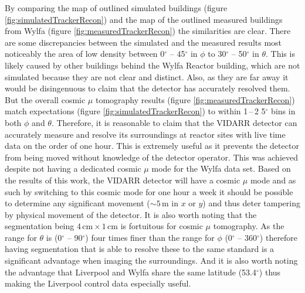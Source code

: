 


By comparing the map of outlined simulated buildings (figure \ref{fig:simulatedTrackerRecon}) and the map of the outlined measured buildings from Wylfa (figure \ref{fig:measuredTrackerRecon}) the similarities are clear. There are some discrepancies between the simulated and the measured results most noticeably the area of low density between 0$^\circ$ -- 45$^\circ$ in $\phi$ to 30$^\circ$ -- 50$^\circ$ in $\theta$. This is likely caused by other buildings behind the Wylfa Reactor building, which are not simulated because they are not clear and distinct. Also, as they are far away it would be disingenuous to claim that the detector has accurately resolved them. But the overall cosmic $\mu$ tomography results (figure \ref{fig:measuredTrackerRecon}) match expectations (figure \ref{fig:simulatedTrackerRecon}) to within 1\,--\,2 5$^\circ$ bins in both $\phi$ and $\theta$. Therefore, it is reasonable to claim that the VIDARR detector can accurately measure and resolve its surroundings at reactor sites with live time data on the order of one hour. This is extremely useful as it prevents the detector from being moved without knowledge of the detector operator. This was achieved despite not having a dedicated cosmic $\mu$ mode for the Wylfa data set. Based on the results of this work, the VIDARR detector will have a cosmic $\mu$ mode and as such by switching to this cosmic mode for one hour a week it should be possible to determine any significant movement ($\sim 5\,\textrm{m}$ in $x$ or $y$) and thus deter tampering by physical movement of the detector. It is also worth noting that the segmentation being $4\,\textrm{cm} \times 1\,\textrm{cm}$ is fortuitous for cosmic $\mu$ tomography. As the range for $\theta$ is (0$^\circ$ -- 90$^\circ$) four times finer than the range for $\phi$ (0$^\circ$ -- 360$^\circ$) therefore having segmentation that is able to resolve these to the same standard is a significant advantage when imaging the surroundings. And it is also worth noting the advantage that Liverpool and Wylfa share the same latitude (53.4$^\circ$) thus making the Liverpool control data especially useful. %

